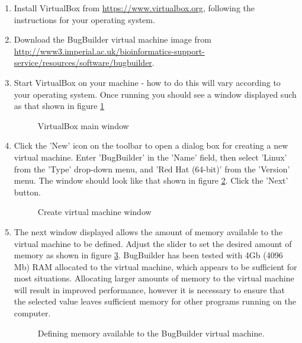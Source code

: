 \documentclass[a4paper,10pt]{article}
\begin{document}
\begin{enumerate}
\item Install VirtualBox from \url{https://www.virtualbox.org}, following the
instructions  for your operating system. 

\item Download the BugBuilder virtual machine image from
\url{http://www3.imperial.ac.uk/bioinformatics-support-service/resources/software/bugbuilder}.

\item Start VirtualBox on your machine - how to do this will vary according to
your operating system. Once running you should see a window displayed such as
that shown in figure \ref{fig:vm_install1}

\begin{figure}[!h] 
\caption{VirtualBox main window} \label{fig:vm_install1} \end{figure}

\item Click the 'New' icon on the toolbar to open a dialog box for creating a
new virtual machine. Enter 'BugBuilder' in the 'Name' field, then select
'Linux' from the 'Type' drop-down menu, and 'Red Hat (64-bit)' from the
'Version' menu. The window should look like that shown in figure
\ref{fig:vm_install2}. Click the 'Next' button.

\begin{figure}[H] 
\caption{Create virtual machine window} \label{fig:vm_install2} \end{figure}

\item The next window displayed allows the amount of memory available to the
virtual machine to be defined. Adjust the slider to set the desired amount of
memory as shown in figure \ref{fig:vm_install3}. BugBuilder has been tested with
4Gb (4096 Mb) RAM allocated to the virtual machine, which appears to be
sufficient for most situations. Allocating larger amounts of memory to the
virtual machine will result in improved performance, however it is necessary to
ensure that the selected value leaves sufficient memory for other programs
running on the computer.

\begin{figure}[H] 
\caption{Defining memory available to the BugBuilder virtual machine.}
\label{fig:vm_install3} \end{figure}


\end{enumerate}
\end{document}
